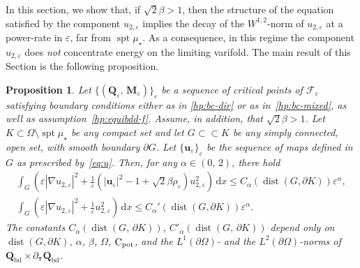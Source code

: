 \documentclass[a4paper, 11pt, twoside, leqno]{article}
\newtheorem{prop}[theorem]{Proposition}
\theoremstyle{definition}              %
\theoremstyle{remark}                  %
\DeclareMathOperator{\dist}{dist}                                   %
\DeclareMathOperator{\spt}{spt}                                     %
\newcommand{\abs}[1]{\left| #1 \right|}                             %
\newcommand{\csubset}{\subset\!\subset}                             %
\renewcommand{\d}{\mathrm{d}}
\newcommand{\Q}{\mathbf{Q}}
\newcommand{\M}{\mathbf{M}}
\renewcommand{\u}{\mathbf{u}}
\newcommand{\F}{\mathscr{F}}
\newcommand{\eps}{\varepsilon}
\newcommand{\Cpot}{{\rm C}_{\rm pot}}
\newcommand{\ttau}{{\boldsymbol{\tau}}}
\newcommand{\Qb}{\Q_{\mathrm{bd}}}
\begin{document}
In this section, we show that, if $\sqrt{2}\beta > 1$,  
then the structure of the equation satisfied by the component $u_{2,\eps}$ implies 
the decay of the $W^{1,2}$-norm of $u_{2,\eps}$ at a power-rate in $\eps$, 
far from $\spt\mu_\star$. 
As a consequence, in this regime the component $u_{2,\eps}$ does \emph{not} 
concentrate energy on the limiting varifold.
The main result of this Section is the following proposition.
\begin{prop}\label{prop:decay-u2}
	Let $\{(\Q_\eps,\,\M_\eps)\}_\eps$ be a sequence of critical points of 
	$\F_\eps$ satisfying boundary conditions either as in \eqref{hp:bc-dir} or as 
	in~\eqref{hp:bc-mixed}, as well as assumption~\eqref{hp:equibdd-f}. 
	Assume, in addition, that $\sqrt{2}\beta > 1$.
    Let $K \subset \Omega \setminus \spt\mu_\star$ be any compact set   
    and let $G \csubset K$ be any simply connected, open set, with smooth 
    boundary $\partial G$.   
    Let $\{\u_\eps\}_\eps$ be the sequence of maps defined in $G$ as prescribed by~\eqref{eq:u}. Then, for any $\alpha \in (0,\,2)$, there hold
    \begin{gather}
        \int_G \left( \eps \abs{\nabla u_{2,\eps}}^2 + \frac{1}{\eps}\left(\abs{\u_\eps}^2 - 1 + \sqrt{2}\beta \rho_\eps \right) u_{2,\eps}^2 \right)\,{\d}x \leq C_\alpha(\dist(G, \partial K)) \eps^\alpha, \label{eq:decay-u2-goal1} \\ 
        \int_G \left( \eps \abs{\nabla u_{2,\eps}}^2 + \frac{1}{\eps} u_{2,\eps}^2 \right)\,{\d}x \leq C_\alpha'(\dist(G, \partial K)) \eps^\alpha \label{eq:decay-u2-goal2}.
    \end{gather}
    The constants $C_\alpha(\dist(G,\,\partial K))$, $C'_\alpha(\dist(G,\,\partial K))$ depend only on $\dist(G, \partial K)$, $\alpha$, $\beta$, $\Omega$, $\Cpot$, and the $L^1(\partial\Omega)$- and the $L^2(\partial\Omega)$-norms of $\Qb \times \partial_\ttau \Qb$. 
\end{prop}
\end{document}
